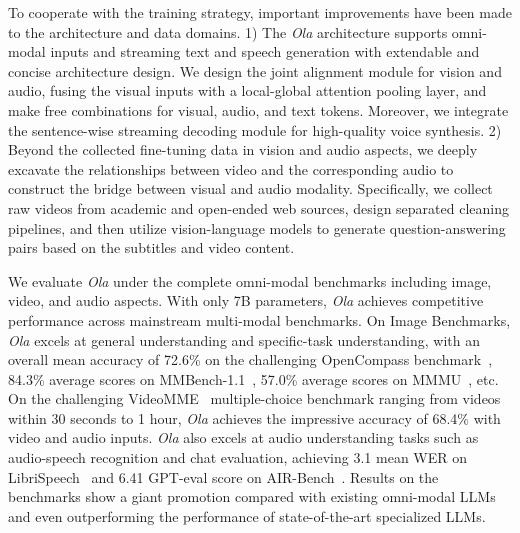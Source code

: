 To cooperate with the training strategy, important improvements have been made to the architecture and data domains. 1) The \textit{Ola} architecture supports omni-modal inputs and streaming text and speech generation with extendable and concise architecture design. We design the joint alignment module for vision and audio, fusing the visual inputs with a local-global attention pooling layer, and make free combinations for visual, audio, and text tokens. Moreover, we integrate the sentence-wise streaming decoding module for high-quality voice synthesis. 2) Beyond the collected fine-tuning data in vision and audio aspects, we deeply excavate the relationships between video and the corresponding audio to construct the bridge between visual and audio modality. Specifically, we collect raw videos from academic and open-ended web sources, design separated cleaning pipelines, and then utilize vision-language models to generate question-answering pairs based on the subtitles and video content.

We evaluate \textit{Ola} under the complete omni-modal benchmarks including image, video, and audio aspects. With only 7B parameters, \textit{Ola} achieves competitive performance across mainstream multi-modal benchmarks. On Image Benchmarks, \textit{Ola} excels at general understanding and specific-task understanding, with an overall mean accuracy of 72.6\% on the challenging OpenCompass benchmark~\citep{duan2024vlmevalkit}, 84.3\% average scores on MMBench-1.1~\citep{liu2023mmbench}, 57.0\% average scores on MMMU~\citep{yue2024mmmu}, etc. On the challenging VideoMME~\citep{fu2024videomme} multiple-choice benchmark ranging from videos within 30 seconds to 1 hour, \textit{Ola} achieves the impressive accuracy of 68.4\% with video and audio inputs. \textit{Ola} also excels at audio understanding tasks such as audio-speech recognition and chat evaluation, achieving 3.1 mean WER on LibriSpeech~\citep{panayotov2015librispeech} and 6.41 GPT-eval score on AIR-Bench~\citep{yang2024airbench}. Results on the benchmarks show a giant promotion compared with existing omni-modal LLMs and even outperforming the performance of state-of-the-art specialized LLMs.

